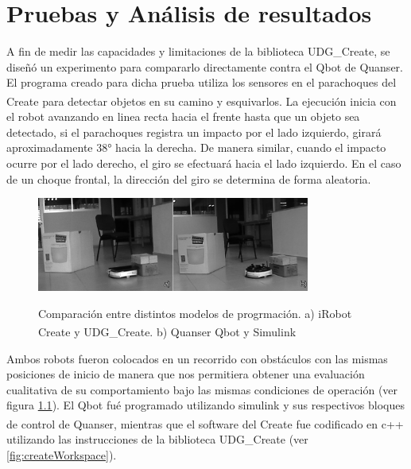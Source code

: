 \documentclass[letterpaper,openright,12pt]{book}
\begin{document}
\chapter{Pruebas y Análisis de resultados}
A fin de medir las capacidades y limitaciones de la biblioteca UDG\_Create, se diseñó un experimento para compararlo directamente contra el Qbot de Quanser.\\
El programa creado para dicha prueba utiliza los sensores en el parachoques del Create\textsuperscript{\textregistered} para detectar objetos en su camino y esquivarlos. La ejecución inicia con el robot avanzando en linea recta hacia el frente hasta que un objeto sea detectado, si el parachoques registra un impacto por el lado izquierdo, girará aproximadamente 38° hacia la derecha. De manera similar, cuando el impacto ocurre por el lado derecho, el giro se efectuará hacia el lado izquierdo. En el caso de un choque frontal, la dirección del giro se determina de forma aleatoria.\\
\begin{figure}
\begin{center}
\includegraphics[width=0.8\textwidth]{figures/benchmark.png}
\caption{Comparación entre distintos modelos de progrmación. a) iRobot Create\textsuperscript{\textregistered} y UDG\_Create. b) Quanser Qbot y Simulink}
\centering
\label{fig:benchmark}
\end{center}
\end{figure} 

Ambos robots fueron colocados en un recorrido con obstáculos con las mismas posiciones de inicio de manera que nos permitiera obtener una evaluación cualitativa de su comportamiento bajo las mismas condiciones de operación (ver figura \ref{fig:benchmark}). El Qbot fué programado utilizando simulink y sus respectivos bloques de control  de Quanser, mientras que el software del Create\textsuperscript{\textregistered} fue codificado en c++ utilizando las instrucciones de la biblioteca UDG\_Create (ver \ref{fig:createWorkspace}).\\
\end{document}
